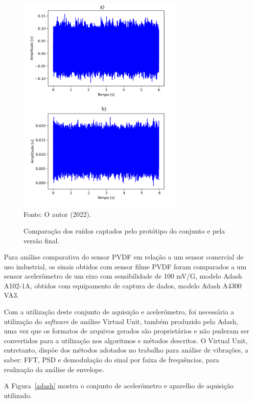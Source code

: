 \documentclass[
	12pt,				
	oneside,			
	a4paper,			
	english,			
	brazil,			
	]{abntex2ppgsi}
\begin{document}
\begin{figure}[H]
\centering
\caption {Comparação dos ruídos captados pelo protótipo do conjunto e pela versão final.}
\includegraphics[width=\textwidth,height=110mm,keepaspectratio]{comparacao_antes_depois_ruido_circuito} \\
Fonte: O autor (2022).
\label{comparacao_antes_depois_ruido_circuito}
\end{figure} 

Para análise comparativa do sensor PVDF em relação a um sensor comercial de uso industrial, os sinais obtidos com sensor filme PVDF foram comparados a um sensor acelerômetro de um eixo com sensibilidade de 100 mV/G, modelo Adash A102-1A, obtidos com equipamento de captura de dados, modelo Adash A4300 VA3. 

Com a utilização deste conjunto de aquisição e acelerômetro, foi necessária a utilização do \textit{software} de análise Virtual Unit, também produzido pela Adash, uma vez que os formatos de arquivos gerados são proprietários e não puderam ser convertidos para a utilização nos algoritmos e métodos descritos. O Virtual Unit, entretanto, dispõe dos métodos adotados no trabalho para análise de vibrações, a saber: FFT, PSD e demodulação do sinal por faixa de frequências, para realização da análise de envelope.

A Figura~\ref{adash} mostra o conjunto de acelerômetro e aparelho de aquisição utilizado.
\end{document}
